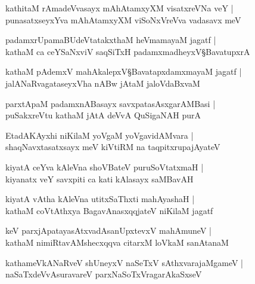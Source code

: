 \begin{shloka}
kathitaM rAmadeVvasayx mAhAtamxyXM visatxreVNa veY |\\
punasatxseyxYva mAhAtamxyXM viSoNxVreVva vadasavx meV 
\end{shloka}

\begin{shloka}
padamxrUpamaBUdeVtatakxthaM heVmamayaM jagatf |\\
kathaM ca ceYSaNxviV saqSiTxH padamxmadheyxV\S BavatupxrA 
\end{shloka}

\begin{shloka}
kathaM pAdemxV mahAkalepxV\S BavatapxdamxmayaM jagatf |\\
jalANaRvagataseyxVha nABw jAtaM jaloVdaBxvaM
\end{shloka}

\begin{shloka}
parxtApaM padamxnABasayx savxpatasAsxgarAMBasi |\\
puSakxreVtu kathaM jAtA deVvA QuSigaNAH purA 
\end{shloka}

\begin{shloka}
EtadAKAyxhi niKilaM yoVgaM yoVgavidAMvara |\\
shaqNavxtasatxsayx meV kiVtiRM na taqpitxrupajAyateV 
\end{shloka}

\begin{shloka}
kiyatA ceYva kAleVna shoVBateV puruSoVtatxmaH |\\
kiyanatx veY savxpiti ca kati kAlasayx saMBavAH 
\end{shloka}

\begin{shloka}
kiyatA vAtha kAleVna utitxSaThxti mahAyashaH |\\
kathaM coVtAthxya BagavAnasxqqjateV niKilaM jagatf 
\end{shloka}

\begin{shloka}
keV parxjApatayasAtxvadAsanUpxtevxV mahAmuneV |\\
kathaM nimiRtavAMshecxqqva citarxM loVkaM sanAtanaM 
\end{shloka}

\begin{shloka}
kathameVkANaRveV shUneyxV naSeTxV sAthxvarajaMgameV |\\
naSaTxdeVvAsuravareV parxNaSoTxVragarAkaSxseV 
\end{shloka}


